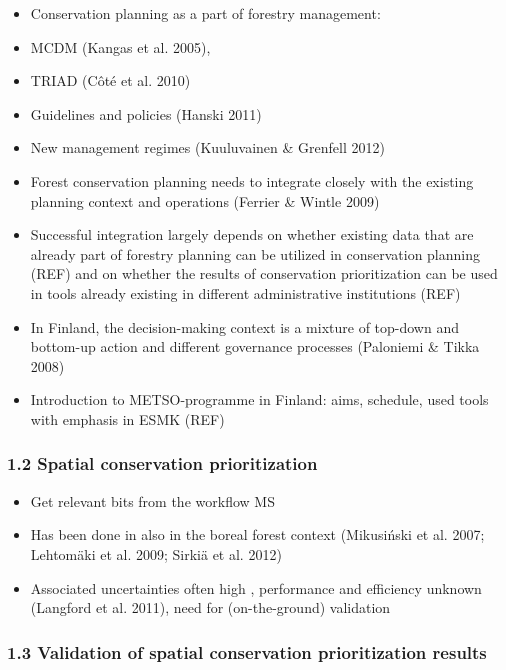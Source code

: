 \documentclass[]{article}
\begin{document}
\begin{itemize}
\itemsep1pt\parskip0pt
\item
  Conservation planning as a part of forestry management:
\item
  MCDM (Kangas et al. 2005),
\item
  TRIAD (Côté et al. 2010)
\item
  Guidelines and policies (Hanski 2011)
\item
  New management regimes (Kuuluvainen \& Grenfell 2012)
\item
  Forest conservation planning needs to integrate closely with the
  existing planning context and operations (Ferrier \& Wintle 2009)
\item
  Successful integration largely depends on whether existing data that
  are already part of forestry planning can be utilized in conservation
  planning (REF) and on whether the results of conservation
  prioritization can be used in tools already existing in different
  administrative institutions (REF)
\item
  In Finland, the decision-making context is a mixture of top-down and
  bottom-up action and different governance processes (Paloniemi \&
  Tikka 2008)
\item
  Introduction to METSO-programme in Finland: aims, schedule, used tools
  with emphasis in ESMK (REF)
\end{itemize}

\subsubsection{1.2 Spatial conservation prioritization}

\begin{itemize}
\itemsep1pt\parskip0pt
\item
  Get relevant bits from the workflow MS
\item
  Has been done in also in the boreal forest context (Mikusiński et al.
  2007; Lehtomäki et al. 2009; Sirkiä et al. 2012)⁠
\item
  Associated uncertainties often high , performance and efficiency
  unknown (Langford et al. 2011), need for (on-the-ground) validation
\end{itemize}

\subsubsection{1.3 Validation of spatial conservation prioritization
results}
\end{document}
